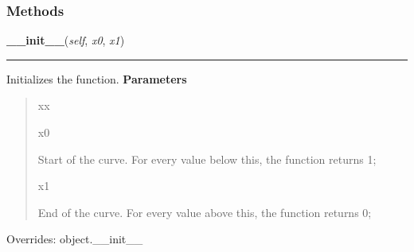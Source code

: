   \subsubsection{Methods}

    \vspace{0.5ex}

\hspace{.8\funcindent}\begin{boxedminipage}{\funcwidth}

    \raggedright \textbf{\_\_init\_\_}(\textit{self}, \textit{x0}, \textit{x1})

    \vspace{-1.5ex}

    \rule{\textwidth}{0.5\fboxrule}
\setlength{\parskip}{2ex}

Initializes the function.
\setlength{\parskip}{1ex}
      \textbf{Parameters}
      \vspace{-1ex}

      \begin{quote}
        \begin{Ventry}{xx}

          \item[x0]


Start of the curve. For every value below this, the function returns
1;
          \item[x1]


End of the curve. For every value above this, the function returns
0;
        \end{Ventry}

      \end{quote}

      Overrides: object.\_\_init\_\_

    \end{boxedminipage}

    \vspace{0.5ex}


